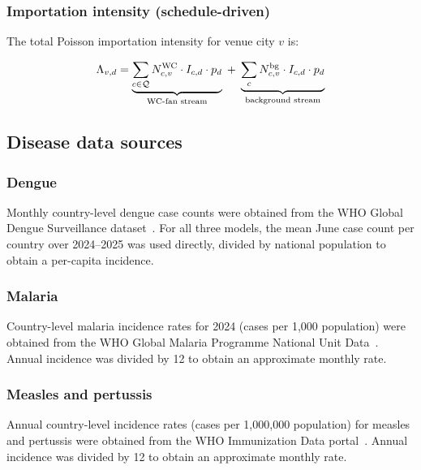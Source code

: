 \documentclass[12pt]{article}
\begin{document}
\subsubsection*{Importation intensity (schedule-driven)}

The total Poisson importation intensity for venue city $v$ is:

\begin{equation}
  \Lambda_{v,d} =
    \underbrace{%
      \sum_{c \in \mathcal{Q}}
        N_{c,v}^{\text{WC}} \cdot I_{c,d} \cdot p_d
    }_{\text{WC-fan stream}}
    \;+\;
    \underbrace{%
      \sum_{c}
        N_{c,v}^{\text{bg}} \cdot I_{c,d} \cdot p_d
    }_{\text{background stream}}
  \label{eq:lambda_schedule}
\end{equation}

\subsection*{Disease data sources}

\subsubsection*{Dengue}

Monthly country-level dengue case counts were obtained from the WHO
Global Dengue Surveillance dataset~\cite{WHO_dengue}. For all three
models, the mean June case count per country over 2024--2025 was used
directly, divided by national population to obtain a per-capita
incidence.

\subsubsection*{Malaria}

Country-level malaria incidence rates for 2024 (cases per 1,000
population) were obtained from the WHO Global Malaria Programme
National Unit Data~\cite{whoWMR2024}. Annual incidence was divided
by 12 to obtain an approximate monthly rate.

\subsubsection*{Measles and pertussis}

Annual country-level incidence rates (cases per 1,000,000 population)
for measles and pertussis were obtained from the WHO Immunization Data
portal~\cite{WHO_immunization}. Annual incidence was divided by 12 to
obtain an approximate monthly rate.
\end{document}
